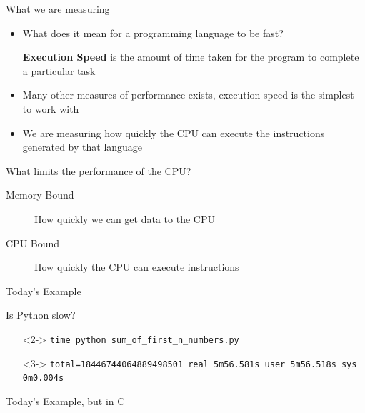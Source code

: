 \documentclass[12pt, aspectration=169]{beamer}
\begin{document}
    \begin{frame}{What we are measuring}
        \begin{itemize}
            \item What does it mean for a programming language to be fast?
            \item[] \textbf{Execution Speed} is the amount of time taken for the program to complete a particular task
            \item Many other measures of performance exists, execution speed is the simplest to work with
            \item We are measuring how quickly the CPU can execute the instructions generated by that language
        \end{itemize}
    \end{frame}

    \begin{frame}{What limits the performance of the CPU?}
        \begin{description}
            \item[Memory Bound] How quickly we can get data to the CPU
            \item[CPU Bound] How quickly the CPU can execute instructions
        \end{description}
    \end{frame}

    \begin{frame}{Today's Example}
        
    \end{frame}

    \begin{frame}{Is Python slow?}
        \begin{itemize}
            \item[]<2-> \texttt{time python sum\_of\_first\_n\_numbers.py\newline}
            \item[]<3-> \texttt{total=18446744064889498501\newline
            real 5m56.581s\newline
            user 5m56.518s\newline
            sys 0m0.004s\newline}
        \end{itemize}
    \end{frame}

    \begin{frame}{Today's Example, but in C}
        
    \end{frame}
\end{document}
